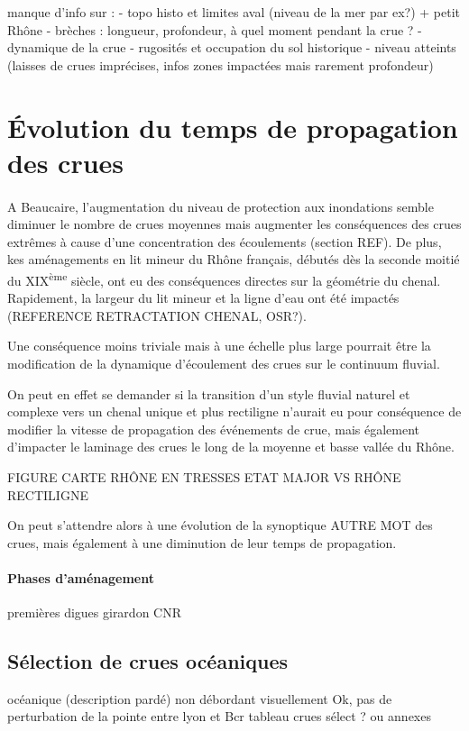 \documentclass[11pt]{article}
\begin{document}
	manque d'info sur : 
	- topo histo et limites aval (niveau de la mer par ex?) + petit Rhône
	- brèches : longueur, profondeur, à quel moment pendant la crue ? 
	- dynamique de la crue
	- rugosités et occupation du sol historique
	- niveau atteints (laisses de crues imprécises, infos zones impactées mais rarement profondeur)
	
\section{Évolution du temps de propagation des crues}

	\paragraph{} A Beaucaire, l'augmentation du niveau de protection aux inondations semble diminuer le nombre de crues moyennes mais augmenter les conséquences des crues extrêmes à cause d'une concentration des écoulements (section REF). De plus, kes aménagements en lit mineur du Rhône français, débutés dès la seconde moitié du XIX\textsuperscript{ème} siècle, ont eu des conséquences directes sur la géométrie du chenal. Rapidement, la largeur du lit mineur et la ligne d'eau ont été impactés (REFERENCE RETRACTATION CHENAL, OSR?). 
	
	Une conséquence moins triviale mais à une échelle plus large pourrait être la modification de la dynamique d'écoulement des crues sur le continuum fluvial.
	
	 On peut en effet se demander si la transition d'un style fluvial naturel et complexe vers un chenal unique et plus rectiligne n'aurait eu pour conséquence de modifier la vitesse de propagation des événements de crue, mais également d'impacter le laminage des crues le long de la moyenne et basse vallée du Rhône. 
	
	FIGURE CARTE RHÔNE EN TRESSES ETAT MAJOR VS RHÔNE RECTILIGNE
	
	
	 On peut s'attendre alors à une évolution de la synoptique AUTRE MOT des crues, mais également à une diminution de leur temps de propagation. 
	
	\paragraph{Phases d'aménagement}
		premières digues
		girardon
		CNR
		
	\subsection{Sélection de crues océaniques}
	océanique (description pardé)
	non débordant
	visuellement Ok, pas de perturbation de la pointe entre lyon et Bcr
	tableau crues sélect ? ou annexes
	
\end{document}
